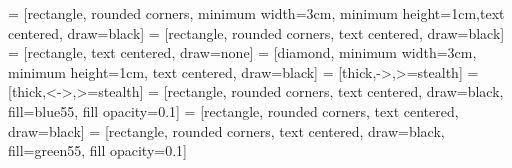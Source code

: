 \newcommand{\ti}[1]{_\mathrm{#1}}
\newcommand\tab[1][1cm]{\hspace*{#1}}

\newcommand{\abs}[1]{\ensuremath{\left\vert#1\right\vert}}
\newcommand{\rdown}[1]{\ensuremath{\left\lfloor#1\right\rfloor}}

\setlength{\fboxsep}{0pt}


 		= [rectangle, rounded corners, minimum width=3cm, minimum height=1cm,text centered, draw=black]
			= [rectangle, rounded corners, text centered, draw=black]
 			= [rectangle, text centered, draw=none]
 		= [diamond, minimum width=3cm, minimum height=1cm, text centered, draw=black]
 			= [thick,->,>=stealth]
 			= [thick,<->,>=stealth]
 	= [rectangle, rounded corners, text centered, draw=black, fill=blue55, fill opacity=0.1]
 			= [rectangle, rounded corners, text centered, draw=black]
 	= [rectangle, rounded corners, text centered, draw=black, fill=green55, fill opacity=0.1]





